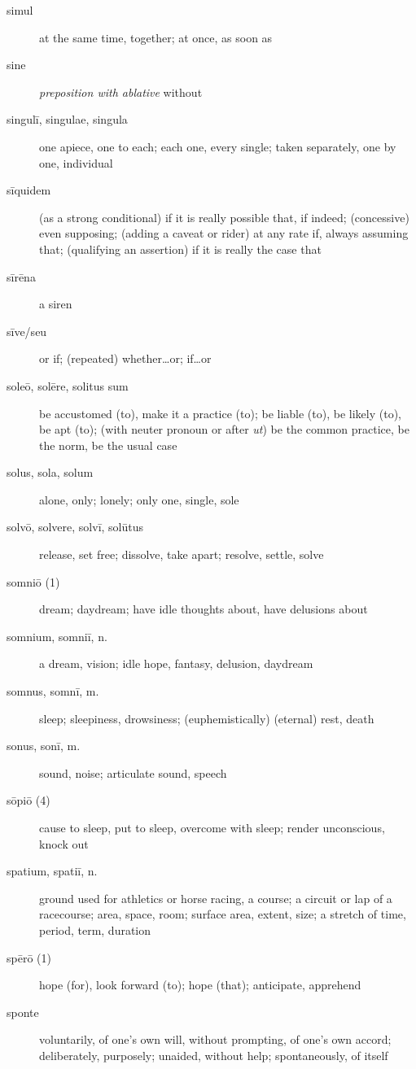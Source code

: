 \begin{description}
    \item[simul] \marginnote{*}at the same time, together; at once, as soon as
    \item[sine] \marginnote{*}\textit{preposition with ablative} without
    \item[singulī, singulae, singula] \marginnote{*}one apiece, one to each; each one, every single; taken separately, one by one, individual
    \item[sīquidem] (as a strong conditional) if it is really possible that, if indeed; (concessive) even supposing; (adding a caveat or rider) at any rate if, always assuming that; (qualifying an assertion) if it is really the case that
    \item[sīrēna] a siren
    \item[sīve/seu] \marginnote{*}or if; (repeated) whether\dots or; if\dots or
    \item[soleō, solēre, solitus sum] \marginnote{*}be accustomed (to), make it a practice (to); be liable (to), be likely (to), be apt (to); (with neuter pronoun or after \textit{ut}) be the common practice, be the norm, be the usual case
    \item[solus, sola, solum] \marginnote{*}alone, only; lonely; only one, single, sole
    \item[solvō, solvere, solvī, solūtus] \marginnote{*}release, set free; dissolve, take apart; resolve, settle, solve
    \item[somniō (1)] dream; daydream; have idle thoughts about, have delusions about
    \item[somnium, somniī, n.] a dream, vision; idle hope, fantasy, delusion, daydream
    \item[somnus, somnī, m.] \marginnote{*}sleep; sleepiness, drowsiness; (euphemistically) (eternal) rest, death
    \item[sonus, sonī, m.] sound, noise; articulate sound, speech
    \item[sōpiō (4)] cause to sleep, put to sleep, overcome with sleep; render unconscious, knock out
    \item[spatium, spatiī, n.] \marginnote{*}ground used for athletics or horse racing, a course; a circuit or lap of a racecourse; area, space, room; surface area, extent, size; a stretch of time, period, term, duration
    \item[spērō (1)] \marginnote{*}hope (for), look forward (to); hope (that); anticipate, apprehend
    \item[sponte] voluntarily, of one's own will, without prompting, of one's own accord; deliberately, purposely; unaided, without help; spontaneously, of itself

\end{description}
